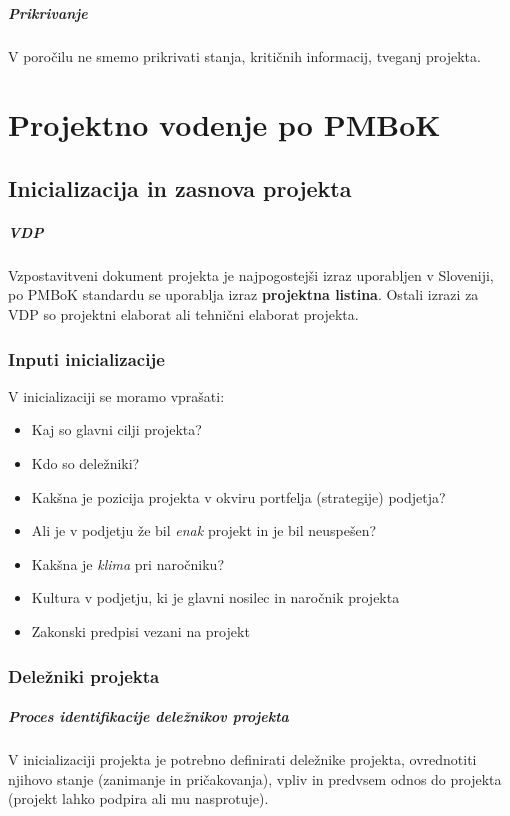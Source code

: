 \documentclass[a4paper,12pt]{report}
\begin{document}
      \paragraph{Prikrivanje} V poročilu ne smemo prikrivati stanja, kritičnih informacij, tveganj projekta.
   

\chapter{Projektno vodenje po PMBoK}
   \section{Inicializacija in zasnova projekta}
      \paragraph{VDP} Vzpostavitveni dokument projekta je najpogostejši izraz uporabljen v Sloveniji, po PMBoK standardu se uporablja izraz \textbf{projektna listina}. Ostali izrazi za VDP so projektni elaborat ali tehnični elaborat projekta.
      \subsection{Inputi inicializacije}
         V inicializaciji se moramo vprašati:
            \begin{itemize}
               \item Kaj so glavni cilji projekta?
               \item Kdo so deležniki?
               \item Kakšna je pozicija projekta v okviru portfelja (strategije) podjetja?
               \item Ali je v podjetju že bil \emph{enak} projekt in je bil neuspešen?
               \item Kakšna je \emph{klima} pri naročniku?
               \item Kultura v podjetju, ki je glavni nosilec in naročnik projekta
               \item Zakonski predpisi vezani na projekt
            \end{itemize}
      
      \subsection{Deležniki projekta}
         \paragraph{Proces identifikacije deležnikov projekta} V inicializaciji projekta je potrebno definirati deležnike projekta, ovrednotiti njihovo stanje (zanimanje in pričakovanja), vpliv in predvsem odnos do projekta (projekt lahko podpira ali mu nasprotuje).
\end{document}
